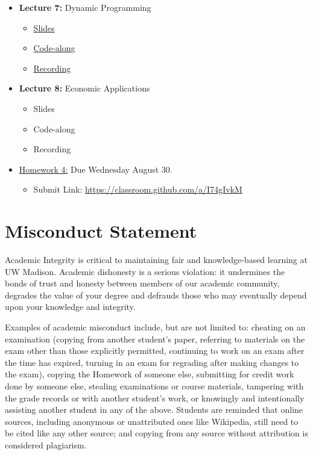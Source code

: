 \documentclass[
]{book}
\providecommand{\tightlist}{%
  \setlength{\itemsep}{0pt}\setlength{\parskip}{0pt}}
\begin{document}
\begin{itemize}
\tightlist
\item
  \textbf{Lecture 7:} Dynamic Programming

  \begin{itemize}
  \tightlist
  \item
    \href{https://kevinghunt.github.io/ComputationCamp/lectures/Lecture7.html}{Slides}
  \item
    \href{https://kevinghunt.github.io/ComputationCamp/codealongs/CodeAlong7.jl}{Code-along}
  \item
    \href{https://uwmadison.zoom.us/rec/share/Kc-WI7JPGEGTFpzW3ojmF0rlotNeRWXARrBrn_ZKzJngDLPBvufu095gegV1knuK.2PadjwKTojeFnyL3}{Recording}
  \end{itemize}
\item
  \textbf{Lecture 8:} Economic Applications

  \begin{itemize}
  \tightlist
  \item
    Slides
  \item
    Code-along
  \item
    Recording
  \end{itemize}
\item
  \href{https://kevinghunt.github.io/ComputationCamp/homeworks/homework4.html}{Homework 4:} Due Wednesday August 30.

  \begin{itemize}
  \tightlist
  \item
    Submit Link: \url{https://classroom.github.com/a/I74gIvkM}
  \end{itemize}
\end{itemize}

\hypertarget{misconduct-statement}{%
\section{Misconduct Statement}\label{misconduct-statement}}

Academic Integrity is critical to maintaining fair and knowledge-based learning at UW Madison. Academic dishonesty is a serious violation: it undermines the bonds of trust and honesty between members of our academic community, degrades the value of your degree and defrauds those who may eventually depend upon your knowledge and integrity.

Examples of academic misconduct include, but are not limited to: cheating on an examination (copying from another student's paper, referring to materials on the exam other than those explicitly permitted, continuing to work on an exam after the time has expired, turning in an exam for regrading after making changes to the exam), copying the Homework of someone else, submitting for credit work done by someone else, stealing examinations or course materials, tampering with the grade records or with another student's work, or knowingly and intentionally assisting another student in any of the above. Students are reminded that online sources, including anonymous or unattributed ones like Wikipedia, still need to be cited like any other source; and copying from any source without attribution is considered plagiarism.
\end{document}
